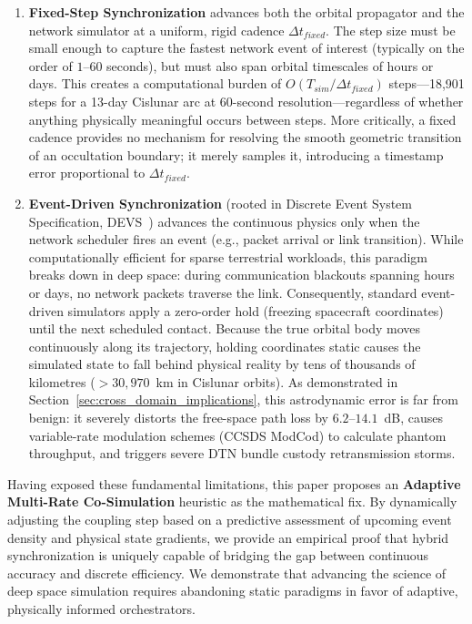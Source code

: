 \documentclass[a4paper,fleqn]{cas-sc}
\begin{document}
\begin{enumerate}
    \item \textbf{Fixed-Step Synchronization} advances both the orbital propagator and the network simulator at a uniform, rigid cadence $\Delta t_{fixed}$. The step size must be small enough to capture the fastest network event of interest (typically on the order of $1$--$60$ seconds), but must also span orbital timescales of hours or days. This creates a computational burden of $O(T_{sim}/\Delta t_{fixed})$ steps---18,901 steps for a 13-day Cislunar arc at 60-second resolution---regardless of whether anything physically meaningful occurs between steps. More critically, a fixed cadence provides no mechanism for resolving the smooth geometric transition of an occultation boundary; it merely samples it, introducing a timestamp error proportional to $\Delta t_{fixed}$.

    \item \textbf{Event-Driven Synchronization} (rooted in Discrete Event System Specification, DEVS~\cite{zeigler2000}) {\color{revcolor}advances the continuous physics only when the network scheduler fires an event (e.g., packet arrival or link transition). While computationally efficient for sparse terrestrial workloads, this paradigm breaks down in deep space: during communication blackouts spanning hours or days, no network packets traverse the link. Consequently, standard event-driven simulators apply a zero-order hold (freezing spacecraft coordinates) until the next scheduled contact. Because the true orbital body moves continuously along its trajectory, holding coordinates static causes the simulated state to fall behind physical reality by tens of thousands of kilometres ($>30,970$~km in Cislunar orbits). As demonstrated in Section~\ref{sec:cross_domain_implications}, this astrodynamic error is far from benign: it severely distorts the free-space path loss by $6.2$--$14.1$~dB, causes variable-rate modulation schemes (CCSDS ModCod) to calculate phantom throughput, and triggers severe DTN bundle custody retransmission storms.}
\end{enumerate}

Having exposed these fundamental limitations, this paper proposes an \textbf{Adaptive Multi-Rate Co-Simulation} heuristic as the mathematical fix. By dynamically adjusting the coupling step based on a predictive assessment of upcoming event density and physical state gradients, we provide an empirical proof that hybrid synchronization is uniquely capable of bridging the gap between continuous accuracy and discrete efficiency. We demonstrate that advancing the science of deep space simulation requires abandoning static paradigms in favor of adaptive, physically informed orchestrators.
\end{document}
